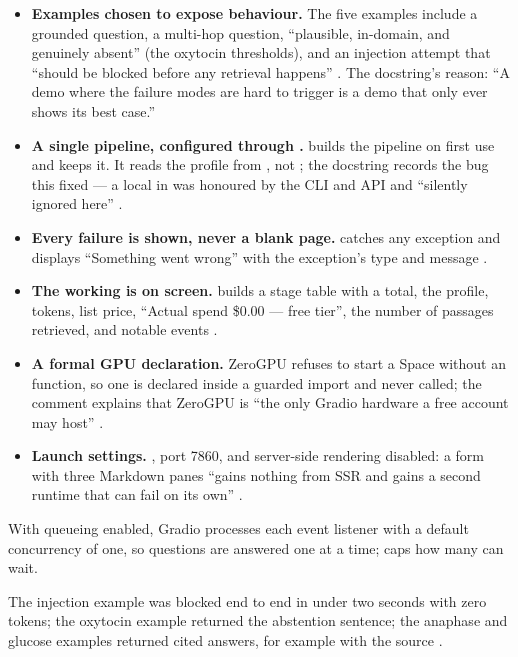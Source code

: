 \begin{itemize}
  \item \textbf{Examples chosen to expose behaviour.} The five examples include a grounded question, a multi-hop question, \enquote{plausible, in-domain, and genuinely absent} (the oxytocin thresholds), and an injection attempt that \enquote{should be blocked before any retrieval happens} . The docstring's reason: \enquote{A demo where the failure modes are hard to trigger is a demo that only ever shows its best case.}
  \item \textbf{A single pipeline, configured through .}  builds the pipeline on first use and keeps it. It reads the profile from , not ; the docstring records the bug this fixed --- a local  in  was honoured by the CLI and API and \enquote{silently ignored here} .
  \item \textbf{Every failure is shown, never a blank page.}  catches any exception and displays \enquote{Something went wrong} with the exception's type and message .
  \item \textbf{The working is on screen.}  builds a stage table with a total, the profile, tokens, list price, \enquote{Actual spend \$0.00 --- free tier}, the number of passages retrieved, and notable events .
  \item \textbf{A formal GPU declaration.} ZeroGPU refuses to start a Space without an  function, so one is declared inside a guarded import and never called; the comment explains that ZeroGPU is \enquote{the only Gradio hardware a free account may host} .
  \item \textbf{Launch settings.} , port 7860, and server-side rendering disabled: a form with three Markdown panes \enquote{gains nothing from SSR and gains a second runtime that can fail on its own} .
\end{itemize}

\begin{background}
With queueing enabled, Gradio processes each event listener with a default concurrency of one, so questions are answered one at a time;  caps how many can wait.
\end{background}

\begin{measured}
The injection example was blocked end to end in under two seconds with zero tokens; the oxytocin example returned the abstention sentence; the anaphase and glucose examples returned cited answers, for example with the source .
\end{measured}

